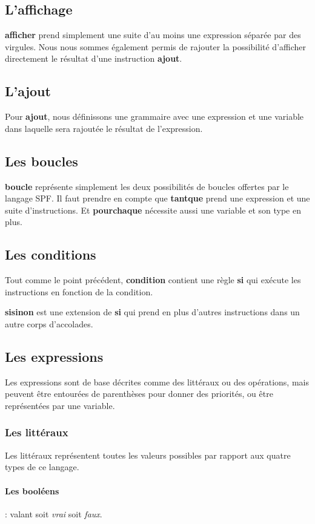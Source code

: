 \subsection{L'affichage}
\textbf{afficher} prend simplement une suite d'au moins une expression séparée par des virgules.
Nous nous sommes également permis de rajouter la possibilité d'afficher directement le résultat d'une instruction \textbf{ajout}. 

\subsection{L'ajout}
Pour \textbf{ajout}, nous définissons une grammaire avec une expression et une variable dans laquelle sera rajoutée le résultat de l'expression.

\subsection{Les boucles}
\textbf{boucle} représente simplement les deux possibilités de boucles offertes par le langage SPF.
Il faut prendre en compte que \textbf{tantque} prend une expression et une suite d'instructions. Et \textbf{pourchaque} nécessite aussi une variable et son type en plus.

\subsection{Les conditions}
Tout comme le point précédent, \textbf{condition} contient une règle \textbf{si} qui exécute les instructions en fonction de la condition.

\textbf{sisinon} est une extension de \textbf{si} qui prend en plus d'autres instructions dans un autre corps d'accolades.

\subsection{Les expressions}
Les expressions sont de base décrites comme des littéraux ou des opérations, mais peuvent être entourées de parenthèses pour donner des priorités, ou être représentées par une variable.

\subsubsection{Les littéraux}
Les littéraux représentent toutes les valeurs possibles par rapport aux quatre types de ce langage.

\paragraph{Les booléens}: valant soit \textit{vrai} soit \textit{faux}.

